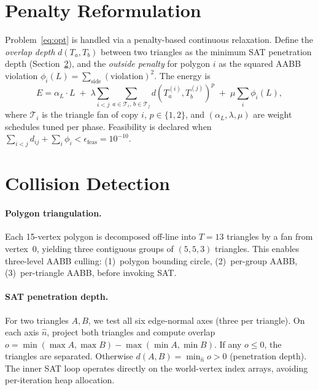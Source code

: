 \documentclass[10pt,twocolumn]{article}
\begin{document}
\section{Penalty Reformulation}
\label{sec:penalty}

Problem~\eqref{eq:opt} is handled via a penalty-based continuous relaxation.
Define the \emph{overlap depth} $d(T_a,T_b)$ between two triangles as the
minimum SAT penetration depth (Section~\ref{sec:collision}), and the
\emph{outside penalty} for polygon $i$ as the squared AABB violation
$\phi_i(L) = \sum_{\text{side}} (\text{violation})^2$.  The energy is
\begin{equation}
  \label{eq:energy}
  E = \alpha_L \cdot L \;+\;
      \lambda \sum_{i<j} \sum_{a\in\mathcal{T}_i,\,b\in\mathcal{T}_j}
        d(T_a^{(i)},T_b^{(j)})^p \;+\;
      \mu \sum_{i} \phi_i(L),
\end{equation}
where $\mathcal{T}_i$ is the triangle fan of copy $i$, $p\in\{1,2\}$,
and $(\alpha_L,\lambda,\mu)$ are weight schedules tuned per phase.
Feasibility is declared when
$\sum_{i<j} d_{ij} + \sum_i \phi_i < \epsilon_{\mathrm{feas}} = 10^{-10}$.

\section{Collision Detection}
\label{sec:collision}

\paragraph{Polygon triangulation.}
Each 15-vertex polygon is decomposed off-line into $T=13$ triangles by a
fan from vertex~0, yielding three contiguous groups of $(5,5,3)$ triangles.
This enables three-level AABB culling: (1)~polygon bounding circle,
(2)~per-group AABB, (3)~per-triangle AABB, before invoking SAT.

\paragraph{SAT penetration depth.}
For two triangles $A,B$, we test all six edge-normal axes (three per triangle).
On each axis $\hat{n}$, project both triangles and compute overlap
$o = \min(\max A, \max B) - \max(\min A, \min B)$.
If any $o\leq 0$, the triangles are separated.  Otherwise
$d(A,B) = \min_{\hat{n}} o > 0$ (penetration depth).  The inner SAT loop
operates directly on the world-vertex index arrays, avoiding per-iteration
heap allocation.
\end{document}
